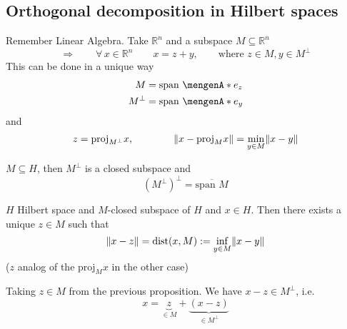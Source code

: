 \subsection{Orthogonal decomposition in Hilbert spaces} 
\label{sub:orthogonal_decomposition_in_hilber_spaces}

Remember Linear Algebra. Take $\mathbb{R}^n$ and a subspace $M \subseteq \mathbb{R}^n$ 
\[
	\Rightarrow \qquad \forall\, x \in \mathbb{R}^n \qquad x = z + y, \qquad \text{where }z \in M, y \in M^{\perp}
\]
This can be done in a unique way
\begin{align*}
	M &= \text{span } \set{e_z} \\ 
	M^{\perp} &= \text{span }\set{e_y}
\end{align*}
and
\[
	z = \text{proj}_{M^{\perp}}x, \qquad \qquad \norm{x - \text{proj}_Mx} = \min_{y \in M}\norm{x-y}
\]


\begin{proposition}
	$M \subseteq H$, then $M^{\perp}$ is a closed subspace and
	\[
		\left( M^{\perp} \right)^{\perp} = \overline{\text{span }M}
	\]
\end{proposition}

\begin{satz}
	$H$ Hilbert space and $M$-closed subspace of $H$ and $x \in H$. Then there exists a unique $z \in M$ such that
	\[
		\norm{x-z} = \dist(x,M) := \inf_{y \in M} \norm{x-y}
	\]
	($z$ analog of the $\text{proj}_Mx$ in the other case)
\end{satz}

\begin{proposition}
	Taking $z \in M$ from the previous proposition. We have $x - z \in M^{\perp}$, i.e.
	\[
		x = \underset{\in M}{\underbrace{z}} + \underset{\in M^{\perp}}{\underbrace{(x - z)}}
	\]
\end{proposition}